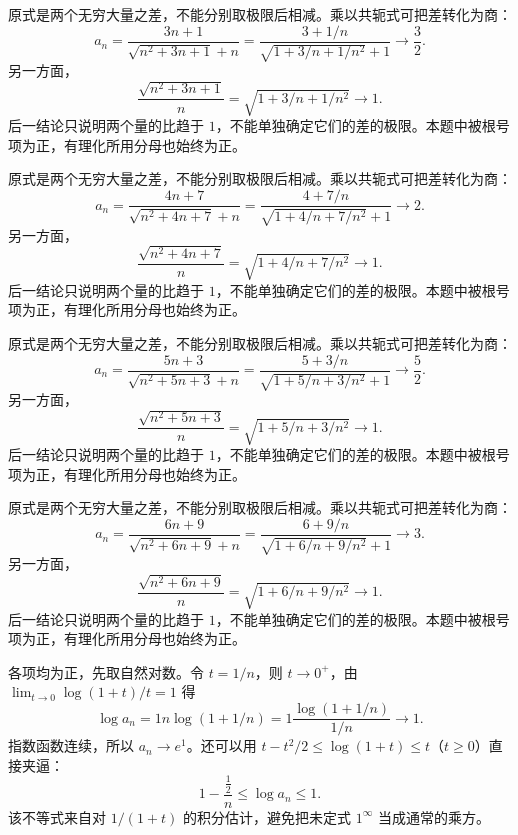 \documentclass[UTF8,12pt,a4paper,fontset=fandol]{ctexart}
\begin{document}
\begin{solve}\label{ans:c1q9}
原式是两个无穷大量之差，不能分别取极限后相减。乘以共轭式可把差转化为商：
\[
a_n=\frac{3n+1}{\sqrt{n^2+3n+1}+n}=\frac{3+1/n}{\sqrt{1+3/n+1/n^2}+1}\longrightarrow \frac{3}{2}.
\]
另一方面，
\[
\frac{\sqrt{n^2+3n+1}}n=\sqrt{1+3/n+1/n^2}\longrightarrow1.
\]
后一结论只说明两个量的比趋于 $1$，不能单独确定它们的差的极限。本题中被根号项为正，有理化所用分母也始终为正。
\end{solve}

\begin{solve}\label{ans:c1q10}
原式是两个无穷大量之差，不能分别取极限后相减。乘以共轭式可把差转化为商：
\[
a_n=\frac{4n+7}{\sqrt{n^2+4n+7}+n}=\frac{4+7/n}{\sqrt{1+4/n+7/n^2}+1}\longrightarrow 2.
\]
另一方面，
\[
\frac{\sqrt{n^2+4n+7}}n=\sqrt{1+4/n+7/n^2}\longrightarrow1.
\]
后一结论只说明两个量的比趋于 $1$，不能单独确定它们的差的极限。本题中被根号项为正，有理化所用分母也始终为正。
\end{solve}

\begin{solve}\label{ans:c1q11}
原式是两个无穷大量之差，不能分别取极限后相减。乘以共轭式可把差转化为商：
\[
a_n=\frac{5n+3}{\sqrt{n^2+5n+3}+n}=\frac{5+3/n}{\sqrt{1+5/n+3/n^2}+1}\longrightarrow \frac{5}{2}.
\]
另一方面，
\[
\frac{\sqrt{n^2+5n+3}}n=\sqrt{1+5/n+3/n^2}\longrightarrow1.
\]
后一结论只说明两个量的比趋于 $1$，不能单独确定它们的差的极限。本题中被根号项为正，有理化所用分母也始终为正。
\end{solve}

\begin{solve}\label{ans:c1q12}
原式是两个无穷大量之差，不能分别取极限后相减。乘以共轭式可把差转化为商：
\[
a_n=\frac{6n+9}{\sqrt{n^2+6n+9}+n}=\frac{6+9/n}{\sqrt{1+6/n+9/n^2}+1}\longrightarrow 3.
\]
另一方面，
\[
\frac{\sqrt{n^2+6n+9}}n=\sqrt{1+6/n+9/n^2}\longrightarrow1.
\]
后一结论只说明两个量的比趋于 $1$，不能单独确定它们的差的极限。本题中被根号项为正，有理化所用分母也始终为正。
\end{solve}

\begin{solve}\label{ans:c1q13}
各项均为正，先取自然对数。令 $t=1/n$，则 $t\to0^+$，由 $\lim_{t\to0}\log(1+t)/t=1$ 得
\[
\log a_n=1n\log(1+1/n)=1\frac{\log(1+1/n)}{1/n}\longrightarrow 1.
\]
指数函数连续，所以 $a_n\to e^{1}$。还可以用 $t-t^2/2\le\log(1+t)\le t$（$t\ge0$）直接夹逼：
\[
1-\frac{\frac{1}{2}}n\le\log a_n\le 1.
\]
该不等式来自对 $1/(1+t)$ 的积分估计，避免把未定式 $1^\infty$ 当成通常的乘方。
\end{solve}
\end{document}
